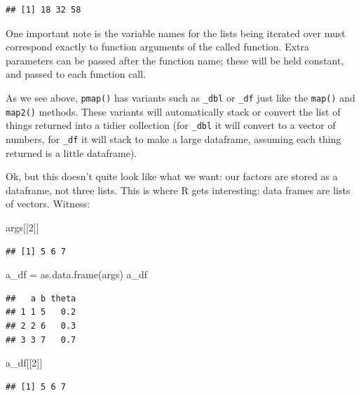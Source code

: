 \documentclass[
]{book}
\newenvironment{Shaded}{\begin{snugshade}}{\end{snugshade}}
\newcommand{\DecValTok}[1]{\textcolor[rgb]{0.00,0.00,0.81}{#1}}
\newcommand{\FunctionTok}[1]{\textcolor[rgb]{0.00,0.00,0.00}{#1}}
\newcommand{\NormalTok}[1]{#1}
\newcommand{\OtherTok}[1]{\textcolor[rgb]{0.56,0.35,0.01}{#1}}
\begin{document}
\begin{verbatim}
## [1] 18 32 58
\end{verbatim}

One important note is the variable names for the lists being iterated over must correspond exactly to function arguments of the called function. Extra parameters can be passed after the function name; these will be held constant, and passed to each function call.

As we see above, \texttt{pmap()} has variants such as \texttt{\_dbl} or \texttt{\_df} just like the \texttt{map()} and \texttt{map2()} methods.
These variants will automatically stack or convert the list of things returned into a tidier collection (for \texttt{\_dbl} it will convert to a vector of numbers, for \texttt{\_df} it will stack to make a large dataframe, assuming each thing returned is a little dataframe).

Ok, but this doesn't quite look like what we want: our factors are stored as a dataframe, not three lists.
This is where R gets interesting: data frames are lists of vectors.
Witness:

\begin{Shaded}
\begin{Highlighting}[]
\NormalTok{args[[}\DecValTok{2}\NormalTok{]]}
\end{Highlighting}
\end{Shaded}

\begin{verbatim}
## [1] 5 6 7
\end{verbatim}

\begin{Shaded}
\begin{Highlighting}[]
\NormalTok{a\_df }\OtherTok{=} \FunctionTok{as.data.frame}\NormalTok{(args)}
\NormalTok{a\_df}
\end{Highlighting}
\end{Shaded}

\begin{verbatim}
##   a b theta
## 1 1 5   0.2
## 2 2 6   0.3
## 3 3 7   0.7
\end{verbatim}

\begin{Shaded}
\begin{Highlighting}[]
\NormalTok{a\_df[[}\DecValTok{2}\NormalTok{]]}
\end{Highlighting}
\end{Shaded}

\begin{verbatim}
## [1] 5 6 7
\end{verbatim}
\end{document}
